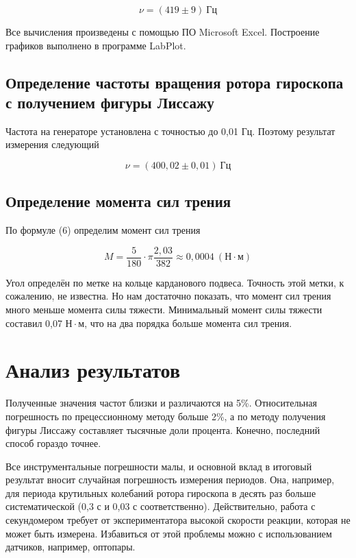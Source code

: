 \documentclass{article}
\begin{document}
\begin{equation}
	\boxed{\nu =  (419 \pm 9)\ Гц}
\end{equation}







Все вычисления произведены с помощью ПО Microsoft Excel. Построение графиков выполнено в программе LabPlot. 

\subsection*{Определение частоты вращения ротора гироскопа с получением фигуры Лиссажу}

Частота на генераторе установлена с точностью до 0,01 Гц. Поэтому результат измерения следующий

\begin{equation}
	\boxed{\nu =  (400,02 \pm 0,01)\ Гц}
\end{equation}

\subsection*{Определение момента сил трения}

По формуле (6) определим момент сил трения

\begin{equation}
	M = \frac{5}{180} \cdot \pi \frac{2,03}{382} \approx 0,0004 \ (Н \cdot м)
\end{equation}

Угол определён по метке на кольце карданового подвеса. Точность этой метки, к сожалению, не известна. Но нам достаточно показать, что момент сил трения много меньше момента силы тяжести. Минимальный момент силы тяжести составил 0,07 $Н \cdot м$, что на два порядка больше момента сил трения.

\section*{Анализ результатов}

\hspace{4mm} Полученные значения частот близки и различаются на 5\%. Относительная погрешность по прецессионному методу больше 2\%, а по методу получения фигуры Лиссажу составляет тысячные доли процента. Конечно, последний способ гораздо точнее. 

Все инструментальные погрешности малы, и основной вклад в итоговый результат вносит случайная погрешность измерения периодов. Она, например, для периода крутильных колебаний ротора гироскопа в десять раз больше систематической (0,3 с и 0,03 с соответственно). Действительно, работа с секундомером требует от экспериментатора высокой скорости реакции, которая не может быть измерена. Избавиться от этой проблемы можно с использованием датчиков, например, оптопары.
\end{document}

